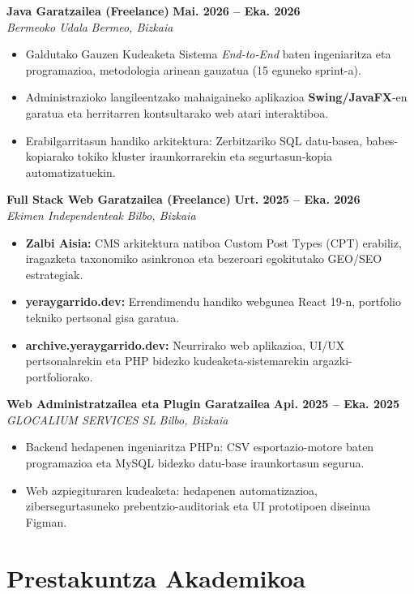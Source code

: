 \documentclass[a4paper,10pt]{article}
\newcommand{\jobheader}[4]{
    \noindent\textbf{#1} \hfill \textbf{#2} \\
    \textit{#3} \hfill \textit{#4} \vspace{3pt}
}
\begin{document}
\jobheader{Java Garatzailea (Freelance)}{Mai. 2026 -- Eka. 2026}{Bermeoko Udala}{Bermeo, Bizkaia}
\begin{itemize}[leftmargin=12pt, itemsep=3pt, topsep=4pt]
    \item Galdutako Gauzen Kudeaketa Sistema \textit{End-to-End} baten ingeniaritza eta programazioa, metodologia arinean gauzatua (15 eguneko sprint-a).
    \item Administrazioko langileentzako mahaigaineko aplikazioa \textbf{Swing/JavaFX}-en garatua eta herritarren kontsultarako web atari interaktiboa.
    \item Erabilgarritasun handiko arkitektura: Zerbitzariko SQL datu-basea, babes-kopiarako tokiko kluster iraunkorrarekin eta segurtasun-kopia automatizatuekin.
\end{itemize}

\jobheader{Full Stack Web Garatzailea (Freelance)}{Urt. 2025 -- Eka. 2026}{Ekimen Independenteak}{Bilbo, Bizkaia}
\begin{itemize}[leftmargin=12pt, itemsep=3pt, topsep=4pt]
    \item \textbf{Zalbi Aisia:} CMS arkitektura natiboa Custom Post Types (CPT) erabiliz, iragazketa taxonomiko asinkronoa eta bezeroari egokitutako GEO/SEO estrategiak.
    \item \textbf{yeraygarrido.dev:} Errendimendu handiko webgunea React 19-n, portfolio tekniko pertsonal gisa garatua.
    \item \textbf{archive.yeraygarrido.dev:} Neurrirako web aplikazioa, UI/UX pertsonalarekin eta PHP bidezko kudeaketa-sistemarekin argazki-portfoliorako.
\end{itemize}

\jobheader{Web Administratzailea eta Plugin Garatzailea}{Api. 2025 -- Eka. 2025}{GLOCALIUM SERVICES SL}{Bilbo, Bizkaia}
\begin{itemize}[leftmargin=12pt, itemsep=3pt, topsep=4pt]
    \item Backend hedapenen ingeniaritza PHPn: CSV esportazio-motore baten programazioa eta MySQL bidezko datu-base iraunkortasun segurua.
    \item Web azpiegituraren kudeaketa: hedapenen automatizazioa, zibersegurtasuneko prebentzio-auditoriak eta UI prototipoen diseinua Figman.
\end{itemize}

\section{Prestakuntza Akademikoa}
\end{document}
